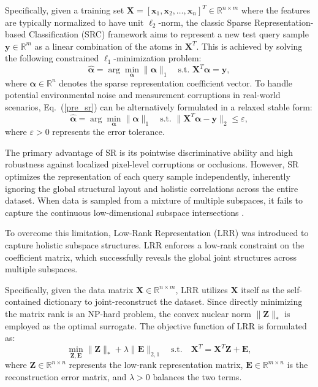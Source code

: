 \documentclass[ASNA,twocolumn]{USG} %
\begin{document}
Specifically, given a training set $\boldsymbol{X} = [\boldsymbol{x}_1, \boldsymbol{x}_2, \dots, \boldsymbol{x}_n]^T \in \mathbb{R}^{n \times m}$ where the features are typically normalized to have unit $\ell_2$-norm, the classic Sparse Representation-based Classification (SRC) framework \cite{4483511} aims to represent a new test query sample $\boldsymbol{y} \in \mathbb{R}^m$ as a linear combination of the atoms in $\boldsymbol{X}^T$. This is achieved by solving the following constrained $\ell_1$-minimization problem:
\begin{equation}\label{pre_sr}
\hat{\boldsymbol{\alpha}} = \arg \min_{\boldsymbol{\alpha}} \|\boldsymbol{\alpha}\|_1 \quad \text{s.t. } \boldsymbol{X}^T \boldsymbol{\alpha} = \boldsymbol{y},
\end{equation}
where $\boldsymbol{\alpha} \in \mathbb{R}^n$ denotes the sparse representation coefficient vector. To handle potential environmental noise and measurement corruptions in real-world scenarios, Eq.~(\ref{pre_sr}) can be alternatively formulated in a relaxed stable form:
\begin{equation}\label{pre_sr_stable}
\hat{\boldsymbol{\alpha}} = \arg \min_{\boldsymbol{\alpha}} \|\boldsymbol{\alpha}\|_1 \quad \text{s.t. } \|\boldsymbol{X}^T \boldsymbol{\alpha} - \boldsymbol{y}\|_2 \le \varepsilon,
\end{equation}
where $\varepsilon > 0$ represents the error tolerance. 

The primary advantage of SR is its pointwise discriminative ability and high robustness against localized pixel-level corruptions or occlusions. However, SR optimizes the representation of each query sample independently, inherently ignoring the global structural layout and holistic correlations across the entire dataset. When data is sampled from a mixture of multiple subspaces, it fails to capture the continuous low-dimensional subspace intersections . 

To overcome this limitation, Low-Rank Representation (LRR) \cite{6180173} was introduced to capture holistic subspace structures. LRR enforces a low-rank constraint on the coefficient matrix, which successfully reveals the global joint structures across multiple subspaces. 

Specifically, given the data matrix $\boldsymbol{X} \in \mathbb{R}^{n \times m}$, LRR utilizes $\boldsymbol{X}$ itself as the self-contained dictionary to joint-reconstruct the dataset. Since directly minimizing the matrix rank is an NP-hard problem, the convex nuclear norm $\|\boldsymbol{Z}\|_*$ is employed as the optimal surrogate. The objective function of LRR is formulated as:
\begin{equation}\label{pre_lrr}
\min_{\boldsymbol{Z}, \boldsymbol{E}} \|\boldsymbol{Z}\|_* + \lambda \|\boldsymbol{E}\|_{2,1} \quad \text{s.t.} \quad \boldsymbol{X}^T = \boldsymbol{X}^T\boldsymbol{Z} + \boldsymbol{E},
\end{equation}
where $\boldsymbol{Z} \in \mathbb{R}^{n \times n}$ represents the low-rank representation matrix, $\boldsymbol{E} \in \mathbb{R}^{m \times n}$ is the reconstruction error matrix, and $\lambda > 0$ balances the two terms. 
\end{document}
